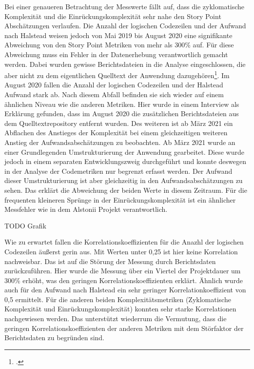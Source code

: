 Bei einer genaueren Betrachtung der Messwerte fällt auf, dass die
zyklomatische Komplexität und die Einrückungskomplexität sehr nahe den
Story Point Abschätzungen verlaufen. Die Anzahl der logischen Codezeilen
und der Aufwand nach Halstead weisen jedoch von Mai 2019 bis August 2020
eine signifikante Abweichung von den Story Point Metriken von mehr als
300\% auf. Für diese Abweichung muss ein Fehler in der Datenerhebung
verantwortlich gemacht werden. Dabei wurden gewisse Berichtsdateien in
die Analyse eingeschlossen, die aber nicht zu dem eigentlichen Quelltext
der Anwendung dazugehören\footcite[Vgl. ][]{stakeholdernInterviewMitStakeholdern2022}. Im August 2020
fallen die Anzahl der logischen Codezeilen und der Halstead Aufwand
stark ab. Nach diesem Abfall befinden sie sich wieder auf einem
ähnlichen Niveau wie die anderen Metriken. Hier wurde in einem Interview
als Erklärung gefunden, dass im August 2020 die zusätzlichen
Berichtsdateien aus dem Quelltextrepository entfernt wurden. Des
weiteren ist ab März 2021 ein Abflachen des Anstieges der Komplexität
bei einem gleichzeitigen weiteren Anstieg der Aufwandsabschätzungen zu
beobachten. Ab März 2021 wurde an einer Grundlegenden Umstrukturierung
der Anwendung gearbeitet. Diese wurde jedoch in einem separaten
Entwicklungszweig durchgeführt und konnte deswegen in der Analyse der
Codemetriken nur begrenzt erfasst werden. Der Aufwand dieser
Umstrukturierung ist aber gleichzeitig in den Aufwandsabschätzungen zu
sehen. Das erklärt die Abweichung der beiden Werte in diesem Zeitraum.
Für die frequenten kleineren Sprünge in der Einrückungskomplexität ist
ein ähnlicher Messfehler wie in dem Alstonii Projekt verantwortlich.

TODO Grafik

Wie zu erwartet fallen die Korrelationskoeffizienten für die Anazhl der
logischen Codezeilen äu\ss erst gerin aus. Mit Werten unter 0,25 ist hier
keine Korrelation nachweisbar. Das ist auf die Störung der Messung durch
Berichtsdaten zurückzuführen. Hier wurde die Messung über ein Viertel
der Projektdauer um 300\% erhöht, was den geringen
Korrelationskoeffizienten erklärt. Ähnlich wurde auch für den Aufwand
nach Halstead ein sehr geringer Korrelationkoeffizient von 0,5
ermittelt. Für die anderen beiden Komplexitätsmetriken (Zyklomatische
Komplexität und Einrückungskomplexität) konnten sehr starke
Korrelationen nachgewiesen werden. Das unterstützt wiederrum die
Vermutung, dass die geringen Korrelationskoeffizienten der anderen
Metriken mit dem Störfaktor der Berichtsdaten zu begründen sind.

